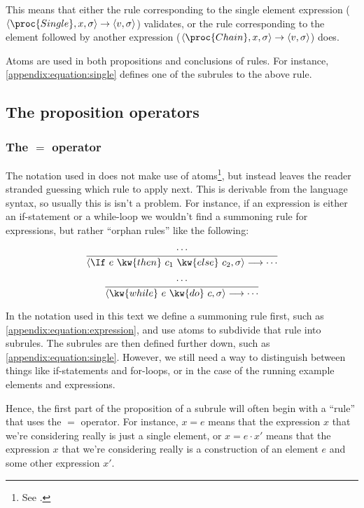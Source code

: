This means that either the rule corresponding to the single element expression
($\left\langle \proc{Single}, x,\sigma\right\rangle\rightarrow\left\langle
v,\sigma\right\rangle$) validates, or the rule corresponding to the element
followed by another expression ($\left\langle \proc{Chain},
x,\sigma\right\rangle\rightarrow\left\langle v,\sigma\right\rangle$) does.

Atoms are used in both propositions and conclusions of rules. For instance,
\ref{appendix:equation:single} defines one of the subrules to the above rule.

\subsection{The proposition operators}

\subsubsection{The $=$ operator}

The notation used in \cite{sos} does not make use of atoms\footnote{See
.}, but instead leaves the reader stranded guessing
which rule to apply next. This is derivable from the language syntax, so
usually this is isn't a problem. For instance, if an expression is either an
if-statement or a while-loop we wouldn't find a summoning rule for expressions,
but rather ``orphan rules'' like the following:

\begin{equation*}
{\displaystyle
  \cdots
\over\displaystyle
  \left\langle\If\ e\ \kw{then}\ c_1\ \kw{else}\ c_2, \sigma\right\rangle
  \longrightarrow
  \cdots
}
\end{equation*}

\begin{equation*}
{\displaystyle
  \cdots
\over\displaystyle
  \left\langle\kw{while}\ e\ \kw{do}\ c, \sigma\right\rangle
  \longrightarrow
  \cdots
}
\end{equation*}

In the notation used in this text we define a summoning rule first, such as
\ref{appendix:equation:expression}, and use atoms to subdivide that rule into
subrules. The subrules are then defined further down, such as
\ref{appendix:equation:single}. However, we still need a way to distinguish
between things like if-statements and for-loops, or in the case of the running
example elements and expressions.

Hence, the first part of the proposition of a subrule will often begin with a
``rule'' that uses the $=$ operator. For instance, $x = e$ means that the
expression $x$ that we're considering really is just a single element, or $x =
e\cdot x'$ means that the expression $x$ that we're considering really is a
construction of an element $e$ and some other expression $x'$.

